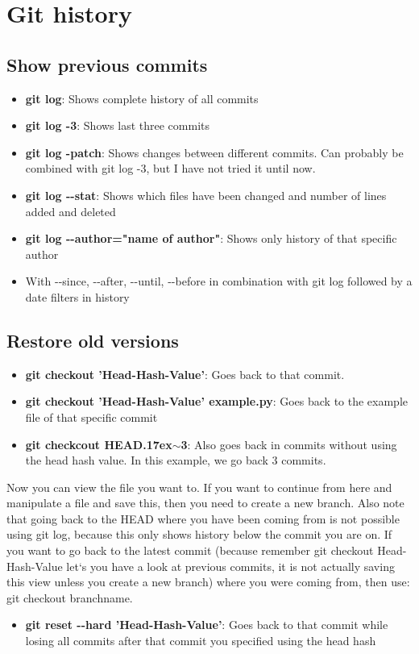 \documentclass[12pt]{article}
\begin{document}
\section{Git history}
\subsection{Show previous commits}
\begin {itemize}
\item \textbf{git log}: Shows complete history of all commits
\item \textbf{git log -3}: Shows last three commits
\item \textbf{git log -patch}: Shows changes between different commits. Can probably be combined with git log -3, but I have not tried it until now.
\item \textbf{git log  \textrm{-}\textrm{-}stat}: Shows which files have been changed and number of lines added and deleted
\item \textbf{git log \textrm{-}\textrm{-}author="name of author"}: Shows only history of that specific author
\item With \textrm{-}\textrm{-}since, \textrm{-}\textrm{-}after, \textrm{-}\textrm{-}until, \textrm{-}\textrm{-}before in combination with git log followed by a date filters in history
\end{itemize}

\subsection{Restore old versions}
\begin {itemize}
\item \textbf{git checkout 'Head-Hash-Value'}: Goes back to that commit.
\item \textbf{git checkout 'Head-Hash-Value' example.py}: Goes back to the example file of that specific commit
\item \textbf{git checkcout HEAD{{\raise.17ex\hbox{$\scriptstyle\mathtt{\sim}$}}3}}: Also goes back in commits without using the head hash value. In this example, we go back 3 commits.
\end{itemize}
Now you can view the file you want to. If you want to continue from here and manipulate a file and save this, then you need to create a new branch. Also note that going back to the HEAD where you have been coming from is not possible using git log, because this only shows history below the commit you are on. If you want to go back to the latest commit (because remember git checkout Head-Hash-Value let`s you have a look at previous commits, it is not actually saving this view unless you create a new branch) where you were coming from, then use: git checkout branchname.
\begin {itemize}
\item \textbf{git reset \textrm{-}\textrm{-}hard 'Head-Hash-Value'}: Goes back to that commit while losing all commits after that commit you specified using the head hash
\end{itemize}
\end{document}
